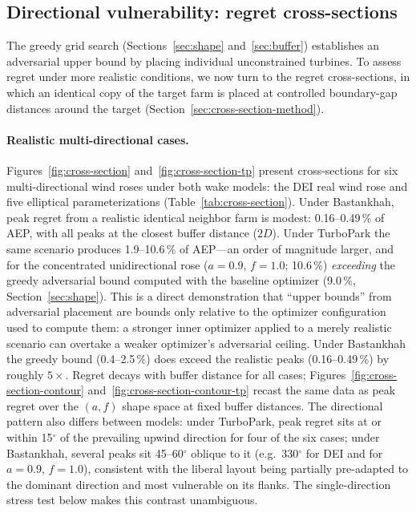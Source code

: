 \documentclass[wes, manuscript]{copernicus}
\begin{document}
\subsection{Directional vulnerability: regret cross-sections}\label{sec:cross-sections}

The greedy grid search (Sections~\ref{sec:shape} and~\ref{sec:buffer}) establishes an adversarial upper bound by placing individual unconstrained turbines.
To assess regret under more realistic conditions, we now turn to the regret cross-sections, in which an identical copy of the target farm is placed at controlled boundary-gap distances around the target (Section~\ref{sec:cross-section-method}).

\paragraph{Realistic multi-directional cases.}
Figures~\ref{fig:cross-section} and~\ref{fig:cross-section-tp} present cross-sections for six multi-directional wind roses under both wake models: the DEI real wind rose and five elliptical parameterizations (Table~\ref{tab:cross-section}).
Under Bastankhah, peak regret from a realistic identical neighbor farm is modest: 0.16--0.49\,\% of AEP, with all peaks at the closest buffer distance ($2D$).
Under TurboPark the same scenario produces 1.9--10.6\,\% of AEP---an order of magnitude larger, and for the concentrated unidirectional rose ($a = 0.9$, $f = 1.0$; 10.6\,\%) \emph{exceeding} the greedy adversarial bound computed with the baseline optimizer (9.0\,\%, Section~\ref{sec:shape}).
This is a direct demonstration that ``upper bounds'' from adversarial placement are bounds only relative to the optimizer configuration used to compute them: a stronger inner optimizer applied to a merely realistic scenario can overtake a weaker optimizer's adversarial ceiling.
Under Bastankhah the greedy bound (0.4--2.5\,\%) does exceed the realistic peaks (0.16--0.49\,\%) by roughly $5\times$.
Regret decays with buffer distance for all cases; Figures~\ref{fig:cross-section-contour} and~\ref{fig:cross-section-contour-tp} recast the same data as peak regret over the $(a, f)$ shape space at fixed buffer distances.
The directional pattern also differs between models: under TurboPark, peak regret sits at or within 15$^\circ$ of the prevailing upwind direction for four of the six cases; under Bastankhah, several peaks sit 45--60$^\circ$ oblique to it (e.g.\ 330$^\circ$ for DEI and for $a = 0.9$, $f = 1.0$), consistent with the liberal layout being partially pre-adapted to the dominant direction and most vulnerable on its flanks.
The single-direction stress test below makes this contrast unambiguous.
\end{document}
